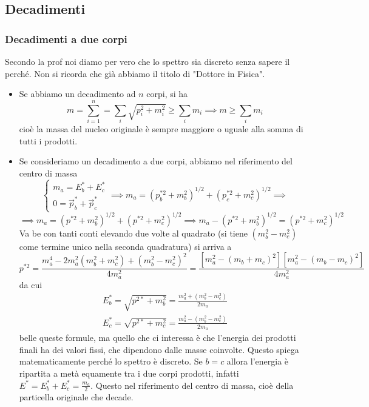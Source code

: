 \subsection{Decadimenti}
\subsubsection{Decadimenti a due corpi}
Secondo la prof noi diamo per vero che lo spettro sia discreto senza sapere il perché. Non si ricorda che già abbiamo il titolo di "Dottore in Fisica".
\begin{itemize}
    \item Se abbiamo un decadimento ad $n$ corpi, si ha
    \begin{equation*}
        m=\sum_{i=1}^n=\sum_i\sqrt{p_i^2+m_i^2}\geq\sum_i m_i\implies m\geq\sum_i m_i
    \end{equation*}
    cioè la massa del nucleo originale è sempre maggiore o uguale alla somma di tutti i prodotti.
    \item Se consideriamo un decadimento a due corpi, abbiamo nel riferimento del centro di massa
    \begin{equation*}
        \begin{cases}
        m_a=E_b^*+E_c^*\\
        0=\vec p_b^*+\vec p_c^*
        \end{cases}\implies m_a=(p^{*2}_b+m_b^2)^{1/2}+(p^{*2}_c+m_c^2)^{1/2}\implies 
    \end{equation*}
    \begin{equation*}
        \implies m_a=(p^{*2}+m_b^2)^{1/2}+(p^{*2}+m_c^2)^{1/2}\implies m_a-(p^{*2}+m_b^2)^{1/2}=(p^{*2}+m_c^2)^{1/2}
    \end{equation*}
    Va be con tanti conti elevando due volte al quadrato (si tiene $(m_b^2-m_c^2)$ come termine unico nella seconda quadratura) si arriva a 
    \begin{equation*}
        p^{*2}=\frac{m_a^4-2m_a^2(m_b^2+m_c^2)+(m_b^2-m_c^2)^2}{4m_a^2}=\frac{[m_a^2-(m_b+m_c)^2][m_a^2-(m_b-m_c)^2]}{4m_a^2}
    \end{equation*}
    da cui
    \begin{equation*}
        \begin{array}{c}
            E_b^*=\sqrt{p^{2*}+m_b^2}=\frac{m_a^2+(m_b^2-m_c^2)}{2m_a} \\
            E_c^*=\sqrt{p^{2*}+m_c^2}=\frac{m_a^2-(m_b^2-m_c^2)}{2m_a}
        \end{array}
    \end{equation*}
    belle queste formule, ma quello che ci interessa è che l'energia dei prodotti finali ha dei valori fissi, che dipendono dalle masse coinvolte. Questo spiega matematicamente perché lo spettro è discreto. Se $b=c$ allora l'energia è ripartita a metà equamente tra i due corpi prodotti, infatti $E^*=E^*_b+E^*_c=\frac{m_a}2$. Questo nel riferimento del centro di massa, cioè della particella originale che decade. 
\end{itemize}
